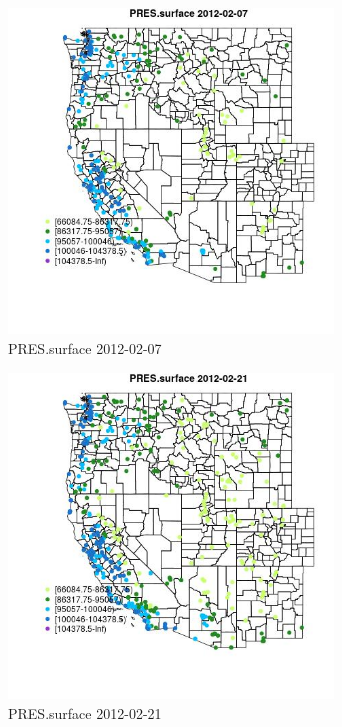 \begin{figure} 
\centering  
\includegraphics[width=0.77\textwidth]{Code_Outputs/Report_ML_input_PM25_Step4_part_f_de_duplicated_aveswNAs_MapObsPRESsurface2012-02-07.jpg} 
\caption{\label{fig:Report_ML_input_PM25_Step4_part_f_de_duplicated_aveswNAsMapObsPRESsurface2012-02-07}PRES.surface 2012-02-07} 
\end{figure} 
 

\begin{figure} 
\centering  
\includegraphics[width=0.77\textwidth]{Code_Outputs/Report_ML_input_PM25_Step4_part_f_de_duplicated_aveswNAs_MapObsPRESsurface2012-02-21.jpg} 
\caption{\label{fig:Report_ML_input_PM25_Step4_part_f_de_duplicated_aveswNAsMapObsPRESsurface2012-02-21}PRES.surface 2012-02-21} 
\end{figure} 
 

